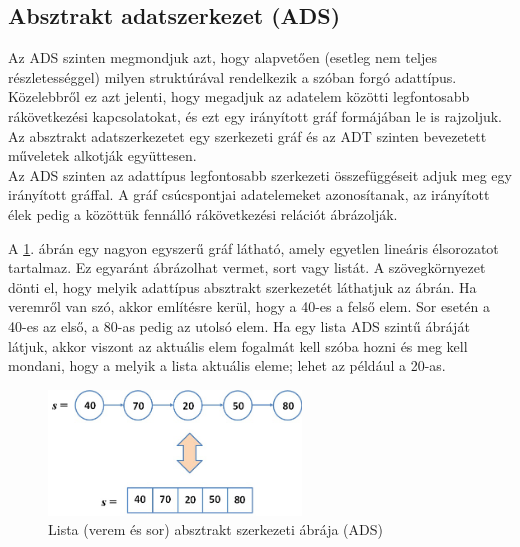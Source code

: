 \documentclass[12pt,margin=0px]{article}
\begin{document}
    \noindent {\footnotesize $\triangleleft$ \faLightbulbO }

	\subsection*{Absztrakt adatszerkezet (ADS)}

    \noindent Az ADS szinten megmondjuk azt, hogy alapvetően (esetleg nem teljes részletességgel) milyen struktúrával rendelkezik a szóban forgó adattípus. Közelebbről ez azt jelenti, hogy megadjuk az adatelem közötti legfontosabb rákövetkezési kapcsolatokat, és ezt egy irányított gráf formájában le is rajzoljuk. Az absztrakt adatszerkezetet egy szerkezeti gráf és az ADT szinten bevezetett műveletek alkotják együttesen.\\

    \noindent Az ADS szinten az adattípus legfontosabb szerkezeti összefüggéseit adjuk meg egy irányított gráffal. A gráf csúcspontjai adatelemeket azonosítanak, az irányított élek pedig a közöttük fennálló rákövetkezési relációt ábrázolják.\\

    {\footnotesize \noindent {\color{blue} \faLightbulbO\ $\triangleright$ } }

    {\footnotesize
    \noindent A \ref{fig:liststack_ads}. ábrán egy nagyon egyszerű gráf látható, amely egyetlen lineáris élsorozatot tartalmaz. Ez egyaránt ábrázolhat vermet, sort vagy listát. A szövegkörnyezet dönti el, hogy melyik adattípus absztrakt szerkezetét láthatjuk az ábrán. Ha veremről van szó, akkor említésre kerül, hogy a 40-es a felső elem. Sor esetén a 40-es az első, a 80-as pedig az utolsó elem. Ha egy lista ADS szintű ábráját látjuk, akkor viszont az aktuális elem fogalmát kell szóba hozni és meg kell mondani, hogy a melyik a lista aktuális eleme; lehet az például a 20-as.}\\

    \begin{figure}[H]
		\centering
		\includegraphics[width=0.6\textwidth]{img/liststack_ads.png}
		\caption{Lista (verem és sor) absztrakt szerkezeti ábrája (ADS)}
        \label{fig:liststack_ads}
	\end{figure}
\end{document}
